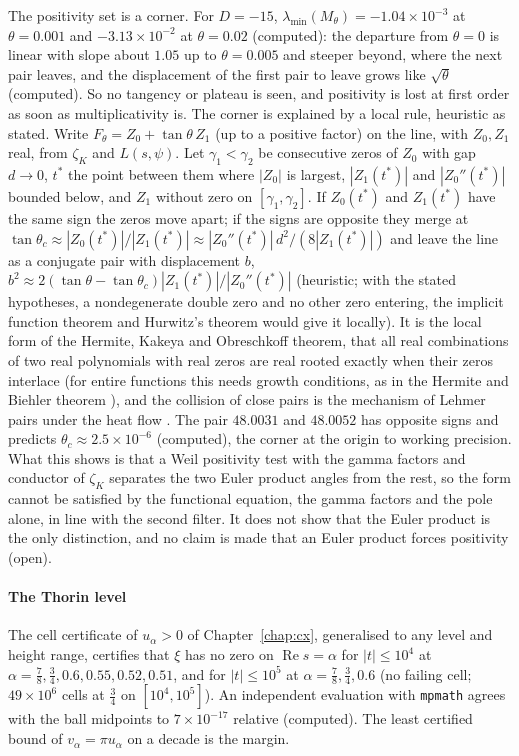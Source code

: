 The positivity set is a corner. For $D=-15$, $\lambda_{\min}(M_\theta)=-1.04\times10^{-3}$ at $\theta=0.001$ and $-3.13\times10^{-2}$ at $\theta=0.02$ (computed): the departure from $\theta=0$ is linear with slope about $1.05$ up to $\theta=0.005$ and steeper beyond, where the next pair leaves, and the displacement of the first pair to leave grows like $\sqrt\theta$ (computed). So no tangency or plateau is seen, and positivity is lost at first order as soon as multiplicativity is. The corner is explained by a local rule, heuristic as stated. Write $F_\theta=Z_0+\tan\theta\,Z_1$ (up to a positive factor) on the line, with $Z_0,Z_1$ real, from $\zeta_K$ and $L(s,\psi)$. Let $\gamma_1<\gamma_2$ be consecutive zeros of $Z_0$ with gap $d\to0$, $t^*$ the point between them where $|Z_0|$ is largest, $|Z_1(t^*)|$ and $|Z_0''(t^*)|$ bounded below, and $Z_1$ without zero on $[\gamma_1,\gamma_2]$. If $Z_0(t^*)$ and $Z_1(t^*)$ have the same sign the zeros move apart; if the signs are opposite they merge at $\tan\theta_c\approx|Z_0(t^*)|/|Z_1(t^*)|\approx|Z_0''(t^*)|\,d^2/(8|Z_1(t^*)|)$ and leave the line as a conjugate pair with displacement $b$, $b^2\approx2(\tan\theta-\tan\theta_c)|Z_1(t^*)|/|Z_0''(t^*)|$ (heuristic; with the stated hypotheses, a nondegenerate double zero and no other zero entering, the implicit function theorem and Hurwitz's theorem would give it locally). It is the local form of the Hermite, Kakeya and Obreschkoff theorem, that all real combinations of two real polynomials with real zeros are real rooted exactly when their zeros interlace (for entire functions this needs growth conditions, as in the Hermite and Biehler theorem \cite{Levin64}), and the collision of close pairs is the mechanism of Lehmer pairs under the heat flow \cite{CSV94}.  The pair $48.0031$ and $48.0052$ has opposite signs and predicts $\theta_c\approx2.5\times10^{-6}$ (computed), the corner at the origin to working precision. What this shows is that a Weil positivity test with the gamma factors and conductor of $\zeta_K$ separates the two Euler product angles from the rest, so the form cannot be satisfied by the functional equation, the gamma factors and the pole alone, in line with the second filter. It does not show that the Euler product is the only distinction, and no claim is made that an Euler product forces positivity (open).

\paragraph{The Thorin level} The cell certificate of $u_\alpha>0$ of Chapter~\ref{chap:cx}, generalised to any level and height range, certifies that $\xi$ has no zero on $\operatorname{Re}s=\alpha$ for $|t|\le10^4$ at $\alpha=\frac78,\frac34,0.6,0.55,0.52,0.51$, and for $|t|\le10^5$ at $\alpha=\frac78,\frac34,0.6$ (no failing cell; $49\times10^6$ cells at $\frac34$ on $[10^4,10^5]$). An independent evaluation with \texttt{mpmath} agrees with the ball midpoints to $7\times10^{-17}$ relative (computed). The least certified bound of $v_\alpha=\pi u_\alpha$ on a decade is the margin.

